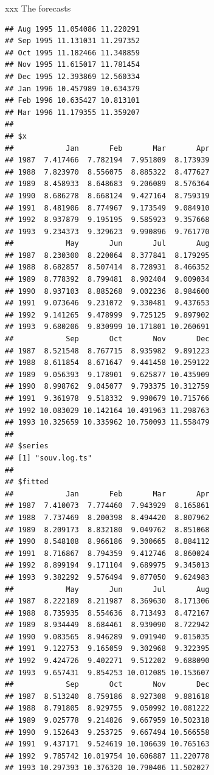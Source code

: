 \documentclass[ignorenonframetext,]{beamer}
\begin{document}
\begin{frame}[fragile]{xxx The forecasts}
\begin{verbatim}
## Aug 1995 11.054086 11.220291
## Sep 1995 11.131031 11.297352
## Oct 1995 11.182466 11.348859
## Nov 1995 11.615017 11.781454
## Dec 1995 12.393869 12.560334
## Jan 1996 10.457989 10.634379
## Feb 1996 10.635427 10.813101
## Mar 1996 11.179355 11.359207
## 
## $x
##            Jan       Feb       Mar       Apr
## 1987  7.417466  7.782194  7.951809  8.173939
## 1988  7.823970  8.556075  8.885322  8.477627
## 1989  8.458933  8.648683  9.206089  8.576364
## 1990  8.686278  8.668124  9.427164  8.759319
## 1991  8.481906  8.774967  9.173549  9.084910
## 1992  8.937879  9.195195  9.585923  9.357668
## 1993  9.234373  9.329623  9.990896  9.761770
##            May       Jun       Jul       Aug
## 1987  8.230300  8.220064  8.377841  8.179295
## 1988  8.682857  8.507414  8.728931  8.466352
## 1989  8.778392  8.799481  8.902404  9.009034
## 1990  8.937103  8.885268  9.002236  8.984600
## 1991  9.073646  9.231072  9.330481  9.437653
## 1992  9.141265  9.478999  9.725125  9.897902
## 1993  9.680206  9.830999 10.171801 10.260691
##            Sep       Oct       Nov       Dec
## 1987  8.521548  8.767715  8.935982  9.891223
## 1988  8.611854  8.671647  9.441458 10.259122
## 1989  9.056393  9.178901  9.625877 10.435909
## 1990  8.998762  9.045077  9.793375 10.312759
## 1991  9.361978  9.518332  9.990679 10.715766
## 1992 10.083029 10.142164 10.491963 11.298763
## 1993 10.325659 10.335962 10.750093 11.558479
## 
## $series
## [1] "souv.log.ts"
## 
## $fitted
##            Jan       Feb       Mar       Apr
## 1987  7.410073  7.774460  7.943929  8.165861
## 1988  7.737469  8.200398  8.494420  8.807962
## 1989  8.209173  8.832180  9.049762  8.851068
## 1990  8.548108  8.966186  9.300665  8.884112
## 1991  8.716867  8.794359  9.412746  8.860024
## 1992  8.899194  9.171104  9.689975  9.345013
## 1993  9.382292  9.576494  9.877050  9.624983
##            May       Jun       Jul       Aug
## 1987  8.222189  8.211987  8.369630  8.171306
## 1988  8.735935  8.554636  8.713493  8.472167
## 1989  8.934449  8.684461  8.939090  8.722942
## 1990  9.083565  8.946289  9.091940  9.015035
## 1991  9.122753  9.165059  9.302968  9.322395
## 1992  9.424726  9.402271  9.512202  9.688090
## 1993  9.657431  9.854253 10.012085 10.153607
##            Sep       Oct       Nov       Dec
## 1987  8.513240  8.759186  8.927308  9.881618
## 1988  8.791805  8.929755  9.050992 10.081222
## 1989  9.025778  9.214826  9.667959 10.502318
## 1990  9.152643  9.253725  9.667494 10.566558
## 1991  9.437171  9.524619 10.106639 10.765163
## 1992  9.785742 10.019754 10.606887 11.220778
## 1993 10.297393 10.376320 10.790406 11.502027

\end{verbatim}
\end{frame}
\end{document}
